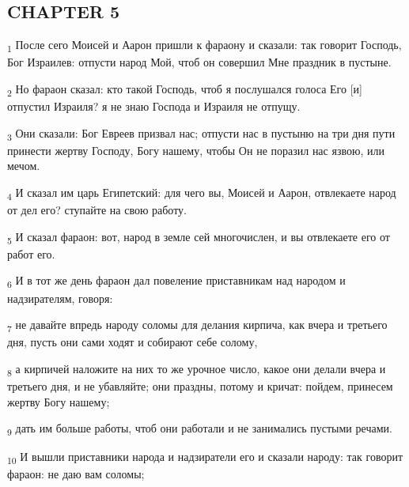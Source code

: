 \subsection{CHAPTER 5}
\begin{tcolorbox}
\textsubscript{1} После сего Моисей и Аарон пришли к фараону и сказали: так говорит Господь, Бог Израилев: отпусти народ Мой, чтоб он совершил Мне праздник в пустыне.
\end{tcolorbox}
\begin{tcolorbox}
\textsubscript{2} Но фараон сказал: кто такой Господь, чтоб я послушался голоса Его [и] отпустил Израиля? я не знаю Господа и Израиля не отпущу.
\end{tcolorbox}
\begin{tcolorbox}
\textsubscript{3} Они сказали: Бог Евреев призвал нас; отпусти нас в пустыню на три дня пути принести жертву Господу, Богу нашему, чтобы Он не поразил нас язвою, или мечом.
\end{tcolorbox}
\begin{tcolorbox}
\textsubscript{4} И сказал им царь Египетский: для чего вы, Моисей и Аарон, отвлекаете народ от дел его? ступайте на свою работу.
\end{tcolorbox}
\begin{tcolorbox}
\textsubscript{5} И сказал фараон: вот, народ в земле сей многочислен, и вы отвлекаете его от работ его.
\end{tcolorbox}
\begin{tcolorbox}
\textsubscript{6} И в тот же день фараон дал повеление приставникам над народом и надзирателям, говоря:
\end{tcolorbox}
\begin{tcolorbox}
\textsubscript{7} не давайте впредь народу соломы для делания кирпича, как вчера и третьего дня, пусть они сами ходят и собирают себе солому,
\end{tcolorbox}
\begin{tcolorbox}
\textsubscript{8} а кирпичей наложите на них то же урочное число, какое они делали вчера и третьего дня, и не убавляйте; они праздны, потому и кричат: пойдем, принесем жертву Богу нашему;
\end{tcolorbox}
\begin{tcolorbox}
\textsubscript{9} дать им больше работы, чтоб они работали и не занимались пустыми речами.
\end{tcolorbox}
\begin{tcolorbox}
\textsubscript{10} И вышли приставники народа и надзиратели его и сказали народу: так говорит фараон: не даю вам соломы;
\end{tcolorbox}

